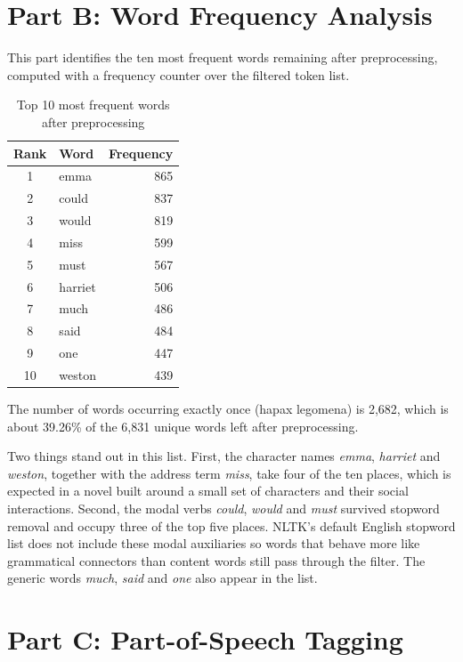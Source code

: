 \documentclass[sigconf]{acmart}
\begin{document}
\section{Part B: Word Frequency Analysis}

This part identifies the ten most frequent words remaining after
preprocessing, computed with a frequency counter over the filtered token
list.

\begin{table}[H]
\caption{Top 10 most frequent words after preprocessing}
\label{tab:partB}
\centering
\begin{tabular}{clr}
\toprule
Rank & Word & Frequency \\
\midrule
1  & emma    & 865 \\
2  & could   & 837 \\
3  & would   & 819 \\
4  & miss    & 599 \\
5  & must    & 567 \\
6  & harriet & 506 \\
7  & much    & 486 \\
8  & said    & 484 \\
9  & one     & 447 \\
10 & weston  & 439 \\
\bottomrule
\end{tabular}
\end{table}

The number of words occurring exactly once (hapax legomena) is 2,682,
which is about 39.26\% of the 6,831 unique words left after preprocessing.

Two things stand out in this list. First, the character names \textit{emma},
\textit{harriet} and \textit{weston}, together with the address term
\textit{miss}, take four of the ten places, which is expected in a novel
built around a small set of characters and their social interactions.
Second, the modal verbs \textit{could}, \textit{would} and \textit{must}
survived stopword removal and occupy three of the top five places. NLTK's default English stopword list does not include these
modal auxiliaries so words that behave more like grammatical connectors
than content words still pass through the filter. The generic words
\textit{much}, \textit{said} and \textit{one} also appear in the list.

\section{Part C: Part-of-Speech Tagging}
\end{document}
